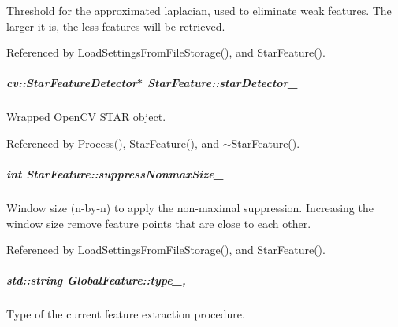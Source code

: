 Threshold for the approximated laplacian, used to eliminate weak features. The larger it is, the less features will be retrieved. 



Referenced by Load\-Settings\-From\-File\-Storage(), and Star\-Feature().

\hypertarget{group___feature_extractor_ae7fdbb1aee60f2289f5d187025a7d094}{
\subparagraph[{star\-Detector\-\_\-}]{\setlength{\rightskip}{0pt plus 5cm}cv\-::\-Star\-Feature\-Detector$\ast$ Star\-Feature\-::star\-Detector\-\_\-\hspace{0.3cm}{\ttfamily [private]}}}\label{group___feature_extractor_ae7fdbb1aee60f2289f5d187025a7d094}


Wrapped Open\-C\-V S\-T\-A\-R object. 



Referenced by Process(), Star\-Feature(), and $\sim$\-Star\-Feature().

\hypertarget{group___feature_extractor_a36265d51f6a800441c974579ab4f6801}{
\subparagraph[{suppress\-Nonmax\-Size\-\_\-}]{\setlength{\rightskip}{0pt plus 5cm}int Star\-Feature\-::suppress\-Nonmax\-Size\-\_\-\hspace{0.3cm}{\ttfamily [private]}}}\label{group___feature_extractor_a36265d51f6a800441c974579ab4f6801}


Window size (n-\/by-\/n) to apply the non-\/maximal suppression. Increasing the window size remove feature points that are close to each other. 



Referenced by Load\-Settings\-From\-File\-Storage(), and Star\-Feature().

\hypertarget{group___feature_extractor_ad467857c4bc3d0fe65ba29e3b8f7c796}{
\subparagraph[{type\-\_\-}]{\setlength{\rightskip}{0pt plus 5cm}std\-::string Global\-Feature\-::type\-\_\-\hspace{0.3cm}{\ttfamily [protected]}, {\ttfamily [inherited]}}}\label{group___feature_extractor_ad467857c4bc3d0fe65ba29e3b8f7c796}


Type of the current feature extraction procedure. 



